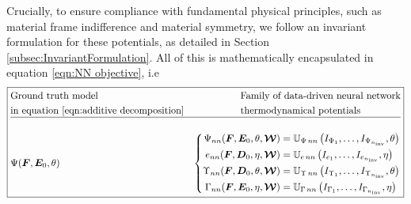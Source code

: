 Crucially, to ensure compliance with fundamental physical principles, such as material frame indifference and material symmetry, we follow an invariant formulation for these potentials, as detailed in Section \ref{subsec:InvariantFormulation}. All of this  is mathematically encapsulated in equation \eqref{eqn:NN objective}, i.e
%
\begin{equation}\label{eqn:NN objective}
\boxed{\begin{aligned}	
&\begin{aligned}
&\text{Ground truth model}\\
&\text{in equation \eqref{eqn:additive decomposition}}
\end{aligned}&
\begin{aligned}
&\text{Family of data-driven neural network}\\
&\text{thermodynamical potentials}
\end{aligned}\\
\hline\\
%
&\Psi(\vect{F},\vect{E}_0,\theta) &\left\{\begin{aligned}
\Psi_{nn}(\vect{F},\vect{E}_0,\theta,\vect{\mathcal{W}})&=\mathbb{U}_{\Psi\,nn}\left(I_{\Psi_1},\dots,I_{\Psi_{n_{\text{inv}}}},\theta\right)\\
e_{nn}(\vect{F},\vect{D}_0,\eta,\vect{\mathcal{W}})&=\mathbb{U}_{e\,nn}\left(I_{e_1},\dots,I_{e_{n_{\text{inv}}}},\eta\right)\\
\Upsilon_{nn}(\vect{F},\vect{D}_0,\theta,\vect{\mathcal{W}})&=\mathbb{U}_{\Upsilon\,nn}\left(I_{\Upsilon_1},\dots,I_{\Upsilon_{n_{\text{inv}}}},\theta\right)\\
\Gamma_{nn}(\vect{F},\vect{E}_0,\eta,\vect{\mathcal{W}})&=\mathbb{U}_{\Gamma\,nn}\left(I_{\Gamma_1},\dots,I_{\Gamma_{n_{\text{inv}}}},\eta\right)
\end{aligned}\right.\\
%
%
\end{aligned}}
\end{equation}
%

